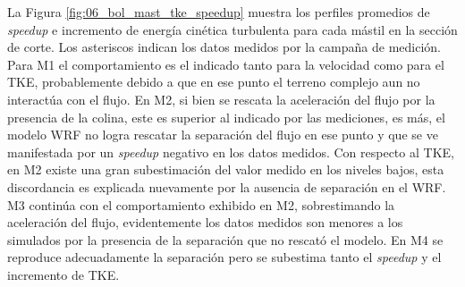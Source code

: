 La Figura \ref{fig:06_bol_mast_tke_speedup} muestra los perfiles promedios de \emph{speedup} e incremento de energía cinética turbulenta para cada mástil en la sección de corte. Los asteriscos indican los datos medidos por la campaña de medición. Para M1 el comportamiento es el indicado tanto para la velocidad como para el TKE, probablemente debido a que en ese punto el terreno complejo aun no interactúa con el flujo. En M2, si bien se rescata la aceleración del flujo por la presencia de la colina, este es superior al indicado por las mediciones, es más, el modelo WRF no logra rescatar la separación del flujo en ese punto y que se ve manifestada por un \emph{speedup} negativo en los datos medidos. Con respecto al TKE, en M2 existe una gran subestimación del valor medido en los niveles bajos, esta discordancia es explicada nuevamente por la ausencia de separación en el WRF. M3 continúa con el comportamiento exhibido en M2, sobrestimando la aceleración del flujo, evidentemente los datos medidos son menores a los simulados por la presencia de la separación que no rescató el modelo. En M4 se reproduce adecuadamente la separación pero se subestima tanto el \emph{speedup} y el incremento de TKE.

